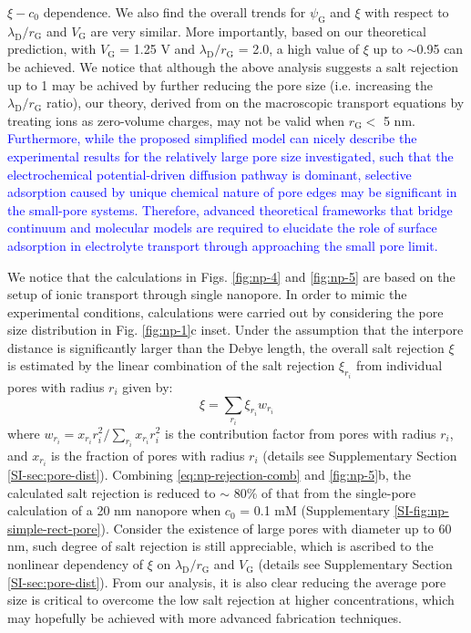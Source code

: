 $\xi - c_{0}$ dependence. We also find the overall trends for
$\psi_{\mathrm{G}}$ and $\xi$ with respect to
$\lambda_{\mathrm{D}}/r_{\mathrm{G}}$ and $V_{\mathrm{G}}$ are very
similar. More importantly, based on our theoretical prediction, with
$V_{\mathrm{G}}$ = 1.25 V and $\lambda_{\mathrm{D}} / r_{\mathrm{G}}$
= { 2.0}, a high value of $\xi$ up to $\sim$0.95 can be achieved.  We
notice that although the above analysis suggests a salt rejection up
to 1 may be achived by further reducing the pore size (i.e. increasing
the $\lambda_{\mathrm{D}}/r_{\mathrm{G}}$ ratio), our theory, derived
from on the macroscopic transport equations by treating ions as
zero-volume charges, may not be valid when $r_{\mathrm{G}}<$ 5
nm\cite{Jain_2015_subcontin_ion}. \textcolor{blue}{ Furthermore, while the proposed
  simplified model can nicely describe the experimental results for
  the relatively large pore size investigated, such that the
  electrochemical potential-driven diffusion pathway is dominant,
  selective adsorption caused by unique chemical nature of pore edges
  may be significant in the small-pore systems. Therefore, advanced
  theoretical frameworks that bridge continuum and molecular models
  are required to elucidate the role of surface adsorption in
  electrolyte transport through approaching the small pore limit. }



{
We notice that the calculations in Figs. \autoref{fig:np-4} and \autoref{fig:np-5} 
are based on the setup  of ionic transport through single nanopore.
In order to mimic the experimental conditions, 
calculations were carried out by considering the pore size distribution in Fig. \autoref{fig:np-1}c inset. 
Under the assumption that the interpore distance is significantly larger than the Debye length,
the overall salt rejection $\xi$ is
estimated by the linear combination of the salt rejection 
$\xi_{r_i}$ 
from individual pores with radius $r_i$ given by:
\begin{equation}
\label{eq:np-rejection-comb}
\xi = \sum_{r_{i}} \xi_{r_{i}} w_{r_{i}}
\end{equation}
where
$w_{r_{i}} = x_{r_{i}} r_{i}^{2} / \sum_{r_{i}} x_{r_{i}} r_{i}^{2} $
is the contribution factor from pores with radius $r_{i}$, and
$x_{r_{i}}$ is the fraction of pores with radius $r_{i}$ (details see
Supplementary Section \autoref{SI-sec:pore-dist}). Combining
 \autoref{eq:np-rejection-comb} and  \autoref{fig:np-5}b, the calculated
salt rejection is reduced to $\sim{}$ 80\% of that from the
single-pore calculation of a 20 nm nanopore when $c_{0}$ = 0.1 mM
(Supplementary  \autoref{SI-fig:np-simple-rect-pore}). Consider the
existence of large pores with diameter up to 60 nm, such degree of
salt rejection is still appreciable, which is ascribed to the
nonlinear dependency of $\xi$ on
$\lambda_{\mathrm{D}} / r_{\mathrm{G}}$ and $V_{\mathrm{G}}$ (details
see Supplementary Section \autoref{SI-sec:pore-dist}).}  From our
analysis, it is also clear reducing the average pore size is critical
to overcome the low salt rejection at higher concentrations, which may
hopefully be achieved with more advanced fabrication techniques.


